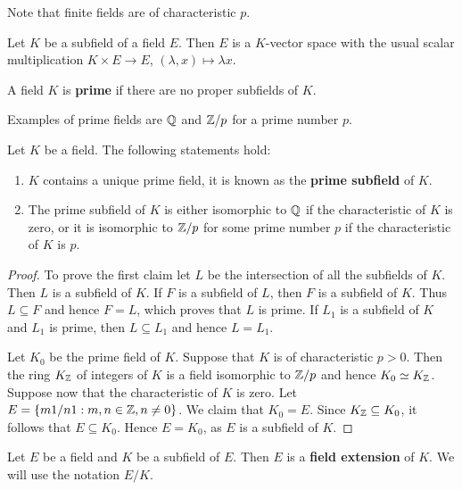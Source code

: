 Note that finite fields are of characteristic $p$. 

Let $K$ be a subfield of a field $E$. Then $E$ 
is a $K$-vector space with the usual scalar multiplication
$K\times E\to E$, 
$(\lambda, x)\mapsto \lambda x$.

\begin{definition}
	A field $K$ is \textbf{prime} if there are no
	proper subfields of $K$. 
\end{definition}

Examples of prime fields are $\mathbb{Q}$ and $\mathbb{Z}/p$ for a prime number $p$.

\begin{proposition}
	Let $K$ be a field. The following statements hold:
	\begin{enumerate}
		\item $K$ contains a unique prime field, it is known as the 
			\textbf{prime subfield} of $K$.
		\item The prime subfield of $K$ is either isomorphic to $\mathbb{Q}$ if 
			the characteristic of $K$ is zero, or it is isomorphic to $\mathbb{Z}/p$ for
			some prime number $p$ if the characteristic of $K$ is $p$. 
	\end{enumerate}
\end{proposition}

\begin{proof}
	To prove the first claim let $L$ be the intersection
	of all the subfields of $K$. Then $L$ is a subfield of $K$. 
	If $F$ is a subfield of $L$, then $F$ is a subfield
	of $K$. Thus $L\subseteq F$ and hence $F=L$, which proves
	that $L$ is prime. If $L_1$ is a subfield of $K$
	and $L_1$ is prime, then $L\subseteq L_1$ and 
	hence $L=L_1$. 

	Let $K_0$ be the prime field of $K$. Suppose that $K$ is of characteristic
	$p>0$. Then the ring $K_{\mathbb{Z}}$ of integers of $K$ 
	is a field isomorphic to $\mathbb{Z}/p$ and hence $K_0\simeq
	K_{\mathbb{Z}}$. Suppose now that the characteristic of $K$ is zero. Let
	$E=\{m1/n1:m,n\in\mathbb{Z},n\ne 0\}$. We claim that $K_0=E$. Since $K_{\mathbb{Z}}\subseteq
	K_0$, it follows that $E\subseteq K_0$. Hence $E=K_0$, as $E$ is a subfield
	of $K$.  
\end{proof}

\begin{definition}
	Let $E$ be a field and $K$ be a subfield of $E$. Then 
	$E$ is a \textbf{field extension} of $K$. We will use
	the notation $E/K$. 
\end{definition}


